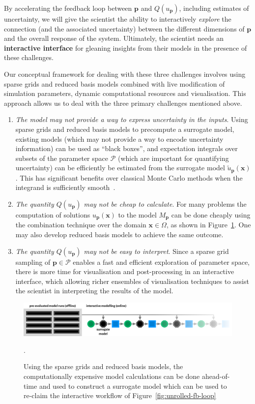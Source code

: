 \documentclass[a4paper,fontsize=12pt]{scrartcl}
\begin{document}
By accelerating the feedback loop between $\mathbf{p}$ and
$Q(u_{\mathbf{p}})$, including estimates of uncertainty, we will give
the scientist the ability to interactively \emph{explore} the
connection (and the associated uncertainty) between the different
dimensions of $\mathbf{p}$ and the overall response of the system.
Ultimately, the scientist needs an \textbf{interactive interface} for
gleaning insights from their models in the presence of these
challenges.

Our conceptual framework for dealing with these three challenges
involves using sparse grids and reduced basis models 
combined with live modification
of simulation parameters, dynamic computational resources and
visualisation. This approach allows us to deal with the three primary
challenges mentioned above.
\begin{enumerate}
\item \emph{The model may not provide a way to express uncertainty in
    the inputs}. Using sparse grids and reduced basis models to precompute
  a surrogate model, existing models (which may not
  provide a way to encode uncertainty information) can be used as
  ``black boxes'', and expectation integrals over subsets of the
  parameter space $\mathcal{P}$ (which are important for quantifying
  uncertainty) can be efficiently be estimated from the
  surrogate model $\tilde{u}_{\mathbf{p}}(\mathbf{x})$. This has
  significant benefits over classical Monte Carlo methods when the
  integrand is sufficiently
  smooth~\parencite{JakemanRoberts2013,FranzelinDiehlPfluger2014}.
\item \emph{The quantity $Q(u_{\mathbf{p}})$ may not be cheap to
    calculate}. For many problems the computation of solutions 
  $u_{\mathbf{p}}(\mathbf{x})$ to the model $M_{\mathbf{p}}$ can be done 
  cheaply using the combination technique over the domain
  $\mathbf{x}\in\Omega$, as shown in Figure~\ref{fig:sg-surrogate-model-fb-loop}.
  One may also develop reduced basis models to achieve the same outcome.
\item \emph{The quantity $Q(u_{\mathbf{p}})$ may not be easy to
    interpret}. Since a sparse grid sampling of $\mathbf{p}\in\mathcal{P}$ enables a fast 
  and efficient exploration of parameter space, there is more time for
  visualisation and post-processing in an interactive interface, which
  allowing richer ensembles of visualisation techniques to assist the
  scientist in interpreting the results of the model.
\end{enumerate}
\begin{figure}
  \centering
  \includegraphics[width=\textwidth]{figures/sg-surrogate-model-fb-loop.pdf}
  \caption{Using the sparse grids and reduced basis models, the computationally
    expensive model calculations can be done ahead-of-time and used to
    construct a surrogate model which can be used to re-claim the
    interactive workflow of Figure~\ref{fig:unrolled-fb-loop}}.
  \label{fig:sg-surrogate-model-fb-loop}
\end{figure}
\end{document}

